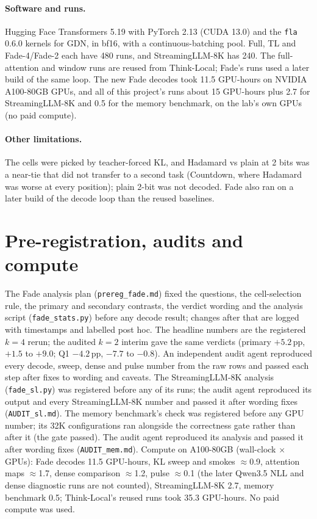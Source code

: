 \documentclass{article}
\newcommand{\pp}{\,pp}
\begin{document}
\paragraph{Software and runs.} Hugging Face Transformers 5.19 with PyTorch 2.13 (CUDA 13.0) and the \texttt{fla} 0.6.0 kernels for GDN, in bf16, with a continuous-batching pool. Full, TL and Fade-4/Fade-2 each have 480 runs, and StreamingLLM-8K has 240. The full-attention and window runs are reused from Think-Local; Fade's runs used a later build of the same loop. The new Fade decodes took 11.5 GPU-hours on NVIDIA A100-80GB GPUs, and all of this project's runs about 15 GPU-hours plus 2.7 for StreamingLLM-8K and 0.5 for the memory benchmark, on the lab's own GPUs (no paid compute).

\paragraph{Other limitations.} The cells were picked by teacher-forced KL, and Hadamard vs plain at 2 bits was a near-tie that did not transfer to a second task (Countdown, where Hadamard was worse at every position); plain 2-bit was not decoded. Fade also ran on a later build of the decode loop than the reused baselines.

\section{Pre-registration, audits and compute}
\label{app:prereg}
The Fade analysis plan (\texttt{prereg\_fade.md}) fixed the questions, the cell-selection rule, the primary and secondary contrasts, the verdict wording and the analysis script (\texttt{fade\_stats.py}) before any decode result; changes after that are logged with timestamps and labelled post hoc. The headline numbers are the registered $k{=}4$ rerun; the audited $k{=}2$ interim gave the same verdicts (primary $+5.2$\pp, $+1.5$ to $+9.0$; Q1 $-4.2$\pp, $-7.7$ to $-0.8$). An independent audit agent reproduced every decode, sweep, dense and pulse number from the raw rows and passed each step after fixes to wording and caveats. The StreamingLLM-8K analysis (\texttt{fade\_sl.py}) was registered before any of its runs; the audit agent reproduced its output and every StreamingLLM-8K number and passed it after wording fixes (\texttt{AUDIT\_sl.md}). The memory benchmark's check was registered before any GPU number; its 32K configurations ran alongside the correctness gate rather than after it (the gate passed). The audit agent reproduced its analysis and passed it after wording fixes (\texttt{AUDIT\_mem.md}). Compute on A100-80GB (wall-clock $\times$ GPUs): Fade decodes 11.5 GPU-hours, KL sweep and smokes ${\approx}$0.9, attention maps ${\approx}$1.7, dense comparison ${\approx}$1.2, pulse ${\approx}$0.1 (the later Qwen3.5 NLL and dense diagnostic runs are not counted), StreamingLLM-8K 2.7, memory benchmark 0.5; Think-Local's reused runs took 35.3 GPU-hours. No paid compute was used.
\end{document}
